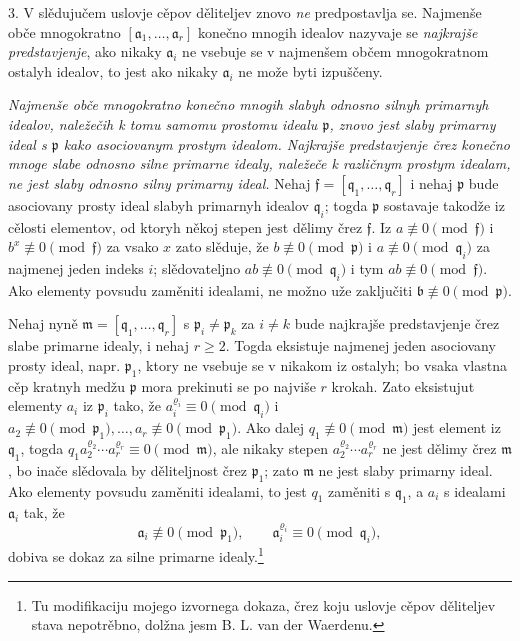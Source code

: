 \documentclass[11pt]{article}
\providecommand{\ma}{\mathfrak{a}}
\providecommand{\mb}{\mathfrak{b}}
\providecommand{\mf}{\mathfrak{f}}
\providecommand{\mm}{\mathfrak{m}}
\providecommand{\mq}{\mathfrak{q}}
\providecommand{\mpideal}{\mathfrak{p}}
\begin{document}
3. V slědujučem uslovje cěpov děliteljev znovo \emph{ne} predpostavlja se. Najmenše obče mnogokratno $[\ma_1,\ldots,\ma_r]$ konečno mnogih idealov nazyvaje se \emph{najkrajše predstavjenje}, ako nikaky $\ma_i$ ne vsebuje se v najmenšem občem mnogokratnom ostalyh idealov, to jest ako nikaky $\ma_i$ ne može byti izpuščeny.

\emph{Najmenše obče mnogokratno konečno mnogih slabyh odnosno silnyh primarnyh idealov, naležečih k tomu samomu prostomu idealu $\mpideal$, znovo jest slaby primarny ideal s $\mpideal$ kako asociovanym prostym idealom. Najkrajše predstavjenje črez konečno mnoge slabe odnosno silne primarne idealy, naležeče k različnym prostym idealam, ne jest slaby odnosno silny primarny ideal.} Nehaj $\mf=[\mq_1,\ldots,\mq_r]$ i nehaj $\mpideal$ bude asociovany prosty ideal slabyh primarnyh idealov $\mq_i$; togda $\mpideal$ sostavaje takodže iz cělosti elementov, od ktoryh někoj stepen jest dělimy črez $\mf$. Iz $a\not\equiv0\pmod{\mf}$ i $b^x\not\equiv0\pmod{\mf}$ za vsako $x$ zato slěduje, že $b\not\equiv0\pmod{\mpideal}$ i $a\not\equiv0\pmod{\mq_i}$ za najmenej jeden indeks $i$; slědovateljno $ab\not\equiv0\pmod{\mq_i}$ i tym $ab\not\equiv0\pmod{\mf}$. Ako elementy povsudu zaměniti idealami, ne možno uže zaključiti $\mb\not\equiv0\pmod{\mpideal}$.

Nehaj nyně $\mm=[\mq_1,\ldots,\mq_r]$ s $\mpideal_i\ne\mpideal_k$ za $i\ne k$ bude najkrajše predstavjenje črez slabe primarne idealy, i nehaj $r\ge2$. Togda eksistuje najmenej jeden asociovany prosty ideal, napr. $\mpideal_1$, ktory ne vsebuje se v nikakom iz ostalyh; bo vsaka vlastna cěp kratnyh medžu $\mpideal$ mora prekinuti se po najviše $r$ krokah. Zato eksistujut elementy $a_i$ iz $\mpideal_i$ tako, že $a_i^{\varrho_i}\equiv0\pmod{\mq_i}$ i $a_2\not\equiv0\pmod{\mpideal_1},\ldots,a_r\not\equiv0\pmod{\mpideal_1}$. Ako dalej $q_1\not\equiv0\pmod{\mm}$ jest element iz $\mq_1$, togda $q_1 a_2^{\varrho_2}\cdots a_r^{\varrho_r}\equiv0\pmod{\mm}$, ale nikaky stepen $a_2^{\varrho_2}\cdots a_r^{\varrho_r}$ ne jest dělimy črez $\mm$, bo inače slědovala by děliteljnost črez $\mpideal_1$; zato $\mm$ ne jest slaby primarny ideal. Ako elementy povsudu zaměniti idealami, to jest $q_1$ zaměniti s $\mq_1$, a $a_i$ s idealami $\ma_i$ tak, že
\[
\ma_i\not\equiv0\pmod{\mpideal_1},\qquad
\ma_i^{\varrho_i}\equiv0\pmod{\mq_i},
\]
dobiva se dokaz za silne primarne idealy.\footnote{Tu modifikaciju mojego izvornega dokaza, črez koju uslovje cěpov děliteljev stava nepotrěbno, dolžna jesm B. L. van der Waerdenu.}
\end{document}

